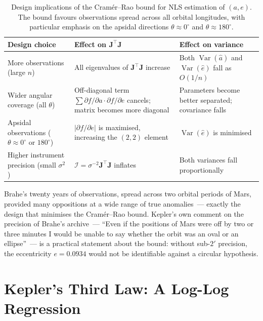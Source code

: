 \documentclass[12pt]{article}
\begin{document}
\begin{table}[h]
\centering
\renewcommand{\arraystretch}{1.25}
\caption{Design implications of the Cram\'er--Rao bound for NLS estimation
  of $(a,e)$.
  The bound favours observations spread across all orbital longitudes,
  with particular emphasis on the apsidal directions $\theta\approx0^{\circ}$
  and $\theta\approx180^{\circ}$.}
\label{tab:design}
\begin{tabular}{@{}p{4.5cm}p{4.5cm}p{4.5cm}@{}}
\toprule
\textbf{Design choice} & \textbf{Effect on $\mathbf{J}^{\top}\mathbf{J}$}
  & \textbf{Effect on variance} \\
\midrule
More observations (large $n$) &
  All eigenvalues of $\mathbf{J}^{\top}\mathbf{J}$ increase &
  Both $\operatorname{Var}(\hat a)$ and $\operatorname{Var}(\hat e)$ fall
  as $O(1/n)$ \\
Wider angular coverage (all $\theta$) &
  Off-diagonal term $\sum \partial f/\partial a \cdot \partial f/\partial e$
  cancels; matrix becomes more diagonal &
  Parameters become better separated; covariance falls \\
Apsidal observations ($\theta\approx0^{\circ}$ or $180^{\circ}$) &
  $|\partial f/\partial e|$ is maximised, increasing the $(2,2)$ element &
  $\operatorname{Var}(\hat e)$ is minimised \\
Higher instrument precision (small $\sigma^{2}$) &
  $\mathcal{I}=\sigma^{-2}\mathbf{J}^{\top}\mathbf{J}$ inflates &
  Both variances fall proportionally \\
\bottomrule
\end{tabular}
\end{table}

Brahe's twenty years of observations, spread across two orbital periods of
Mars, provided many oppositions at a wide range of true anomalies~---
exactly the design that minimises the Cram\'er--Rao bound.
Kepler's own comment on the precision of Brahe's archive~---
``Even if the positions of Mars were off by two or three minutes I would
be unable to say whether the orbit was an oval or an ellipse''~---
is a practical statement about the bound: without sub-$2'$ precision,
the eccentricity $e=0.0934$ would not be identifiable against a circular
hypothesis.

\section{Kepler's Third Law: A Log-Log Regression}
\label{sec:k3}
\end{document}
